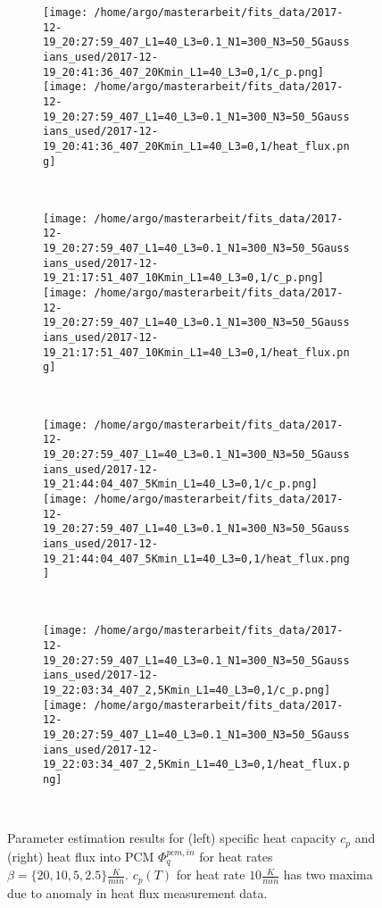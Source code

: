 \documentclass{scrartcl}[12pt, halfparskip]
\numberwithin{equation}{section}
\numberwithin{figure}{section}
\numberwithin{table}{section}
\begin{document}
\begin{figure}[H]
	\begin{subfigure}{1.\textwidth}
		\texttt{[image: /home/argo/masterarbeit/fits\_data/2017-12-19\_20:27:59\_407\_L1=40\_L3=0.1\_N1=300\_N3=50\_5Gaussians\_used/2017-12-19\_20:41:36\_407\_20Kmin\_L1=40\_L3=0,1/c\_p.png]}
		\texttt{[image: /home/argo/masterarbeit/fits\_data/2017-12-19\_20:27:59\_407\_L1=40\_L3=0.1\_N1=300\_N3=50\_5Gaussians\_used/2017-12-19\_20:41:36\_407\_20Kmin\_L1=40\_L3=0,1/heat\_flux.png]}
	\end{subfigure} \\[1ex]
	
	\begin{subfigure}{1.\textwidth}
		\texttt{[image: /home/argo/masterarbeit/fits\_data/2017-12-19\_20:27:59\_407\_L1=40\_L3=0.1\_N1=300\_N3=50\_5Gaussians\_used/2017-12-19\_21:17:51\_407\_10Kmin\_L1=40\_L3=0,1/c\_p.png]}
		\texttt{[image: /home/argo/masterarbeit/fits\_data/2017-12-19\_20:27:59\_407\_L1=40\_L3=0.1\_N1=300\_N3=50\_5Gaussians\_used/2017-12-19\_21:17:51\_407\_10Kmin\_L1=40\_L3=0,1/heat\_flux.png]}
	\end{subfigure} \\[1ex]
	
	\begin{subfigure}{1.\textwidth}
		\texttt{[image: /home/argo/masterarbeit/fits\_data/2017-12-19\_20:27:59\_407\_L1=40\_L3=0.1\_N1=300\_N3=50\_5Gaussians\_used/2017-12-19\_21:44:04\_407\_5Kmin\_L1=40\_L3=0,1/c\_p.png]}
		\texttt{[image: /home/argo/masterarbeit/fits\_data/2017-12-19\_20:27:59\_407\_L1=40\_L3=0.1\_N1=300\_N3=50\_5Gaussians\_used/2017-12-19\_21:44:04\_407\_5Kmin\_L1=40\_L3=0,1/heat\_flux.png]}
	\end{subfigure} \\[1ex]
	
	\begin{subfigure}{1.\textwidth}
		\texttt{[image: /home/argo/masterarbeit/fits\_data/2017-12-19\_20:27:59\_407\_L1=40\_L3=0.1\_N1=300\_N3=50\_5Gaussians\_used/2017-12-19\_22:03:34\_407\_2,5Kmin\_L1=40\_L3=0,1/c\_p.png]}
		\texttt{[image: /home/argo/masterarbeit/fits\_data/2017-12-19\_20:27:59\_407\_L1=40\_L3=0.1\_N1=300\_N3=50\_5Gaussians\_used/2017-12-19\_22:03:34\_407\_2,5Kmin\_L1=40\_L3=0,1/heat\_flux.png]}
	\end{subfigure} \\[1ex]
	

	\caption{Parameter estimation results for (left) specific heat capacity $c_p$ and (right) heat flux into PCM $\varPhi_q^{pcm,in}$ for heat rates $\beta=\{ 20, 10, 5, 2.5 \} \frac{K}{min}$. $c_p(T)$ for heat rate $10 \frac{K}{min}$ has two maxima due to anomaly in heat flux measurement data. }
	\label{fig:optim_c_p_heat_flux_5Gaussians_1}
\end{figure}
\end{document}

